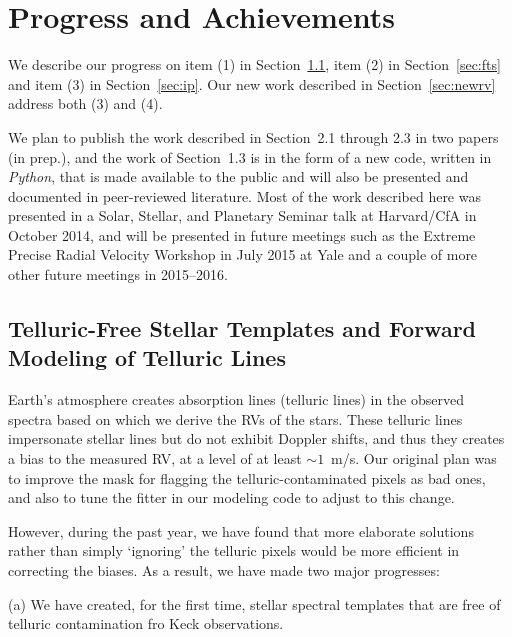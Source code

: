 \documentclass[12pt]{article}
\def\mps{m/s}
\begin{document}
\vspace{-10pt}
\section{Progress and Achievements}
\vspace{-5pt}

We describe our progress on item (1) in Section~\ref{sec:tell}, item
(2) in Section~\ref{sec:fts} and item (3) in Section~\ref{sec:ip}. Our
new work described in Section~\ref{sec:newrv} address both (3) and
(4).

We plan to publish the work described in Section~2.1 through 2.3 in
two papers (in prep.), and the work of Section~1.3 is in the form of a
new code, written in {\it Python}, that is made available to the
public and will also be presented and documented in peer-reviewed
literature. Most of the work described here was presented in a Solar,
Stellar, and Planetary Seminar talk at Harvard/CfA in October 2014,
and will be presented in future meetings such as the Extreme Precise
Radial Velocity Workshop in July 2015 at Yale and a couple of more
other future meetings in 2015--2016.


\vspace{-10pt}
\subsection{Telluric-Free Stellar Templates and Forward Modeling of
  Telluric Lines}\label{sec:tell}
\vspace{-5pt}

Earth's atmosphere creates absorption lines (telluric lines) in the
observed spectra based on which we derive the RVs of the stars. These
telluric lines impersonate stellar lines but do not exhibit Doppler
shifts, and thus they creates a bias to the measured RV, at a level of
at least $\sim1$~\mps. Our original plan was to improve the mask for
flagging the telluric-contaminated pixels as bad ones, and also to
tune the fitter in our modeling code to adjust to this change.

However, during the past year, we have found that more elaborate
solutions rather than simply `ignoring' the telluric pixels would
be more efficient in correcting the biases. As a result, we have made
two major progresses:

(a) We have created, for the first time, stellar spectral templates
that are free of telluric contamination fro Keck observations.
\end{document}
